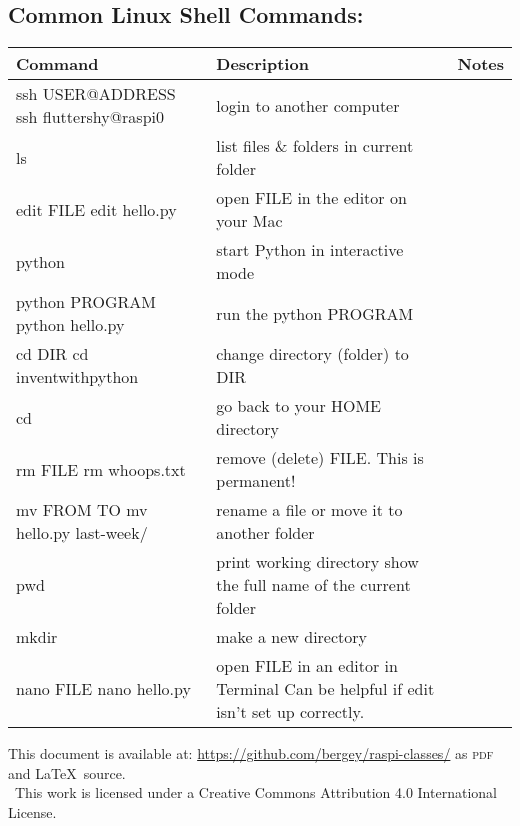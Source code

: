 \documentclass{article}
\begin{document}
\subsection*{Common Linux Shell Commands:}

\begin{tabularx}{\textwidth}{@{} Y Y Y @{}}
  Command & Description & Notes \\
  \midrule
   ssh USER@ADDRESS \newline ssh fluttershy@raspi0 & login to another computer & \\
   ls & list files \& folders in current folder & \\
   edit FILE \newline edit hello.py & open FILE in the editor on your Mac & \\
   python & start Python in interactive mode & \\
   python PROGRAM \newline python hello.py & run the python PROGRAM & \\
   cd DIR \newline cd inventwithpython & change directory (folder) to DIR & \\
   cd & go back to your  HOME directory & \\
   rm FILE \newline rm whoops.txt & remove (delete) FILE.  \newline This is permanent! & \\
   mv FROM TO \newline mv hello.py last-week/  & rename a file or move it to another folder & \\
   pwd & print working directory \newline show the full name of the current folder & \\
   mkdir & make a new directory & \\
   nano FILE \newline nano hello.py & open FILE in an editor in Terminal \newline Can be helpful if edit isn't set up correctly. & \\
\end{tabularx}

This document is available at: \url{https://github.com/bergey/raspi-classes/} as \textsc{pdf} and \LaTeX\ source.\\
\ccby \ This work is licensed under a Creative Commons Attribution 4.0 International License.
\end{document}
